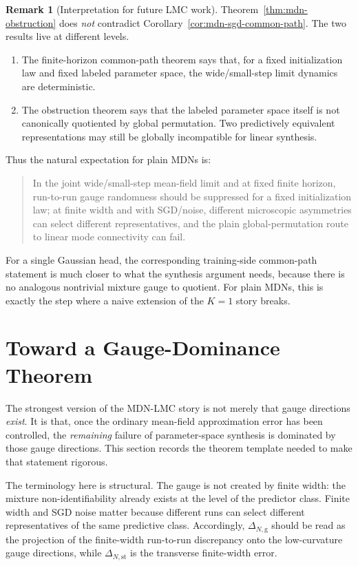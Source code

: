\documentclass[11pt]{article}
\theoremstyle{definition}
\newtheorem{remark}[theorem]{Remark}
\begin{document}
\begin{remark}[Interpretation for future LMC work]
Theorem~\ref{thm:mdn-obstruction} does \emph{not} contradict
Corollary~\ref{cor:mdn-sgd-common-path}. The two results live at different
levels.
\begin{enumerate}[label=(\alph*)]
  \item The finite-horizon common-path theorem says that, for a fixed
  initialization law and fixed labeled parameter space, the wide/small-step
  limit dynamics are deterministic.
  \item The obstruction theorem says that the labeled parameter space itself is
  not canonically quotiented by global permutation. Two predictively equivalent
  representations may still be globally incompatible for linear synthesis.
\end{enumerate}
Thus the natural expectation for plain MDNs is:
\begin{quote}
In the joint wide/small-step mean-field limit and at fixed finite horizon,
run-to-run gauge randomness should be suppressed for a fixed initialization law;
at finite width and with SGD/noise, different microscopic asymmetries can
select different representatives, and the plain global-permutation route to
linear mode connectivity can fail.
\end{quote}
For a single Gaussian head, the corresponding training-side common-path
statement is much closer to what the synthesis argument needs, because there is
no analogous nontrivial mixture gauge to quotient. For plain MDNs, this is
exactly the step where a naive extension of the $K=1$ story breaks.
\end{remark}

\section{Toward a Gauge-Dominance Theorem}

The strongest version of the MDN-LMC story is not merely that gauge directions
\emph{exist}. It is that, once the ordinary mean-field approximation error has
been controlled, the \emph{remaining} failure of parameter-space synthesis is
dominated by those gauge directions. This section records the theorem template
needed to make that statement rigorous.

The terminology here is structural. The gauge is not created by finite width:
the mixture non-identifiability already exists at the level of the predictor
class. Finite width and SGD noise matter because different runs can select
different representatives of the same predictive class. Accordingly,
$\Delta_{N,\mathrm{g}}$ should be read as the projection of the finite-width
run-to-run discrepancy onto the low-curvature gauge directions, while
$\Delta_{N,\mathrm{st}}$ is the transverse finite-width error.
\end{document}
